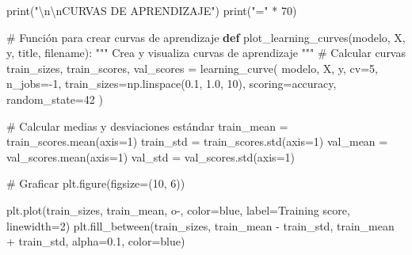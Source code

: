 \documentclass[
  doc,
  floatsintext,
  longtable,
  a4paper,
  nolmodern,
  notxfonts,
  notimes,
  12pt,
  colorlinks=true,linkcolor=blue,citecolor=blue,urlcolor=blue]{apa7}
\newenvironment{Shaded}{\begin{snugshade}}{\end{snugshade}}
\newcommand{\BuiltInTok}[1]{\textcolor[rgb]{0.00,0.23,0.31}{#1}}
\newcommand{\CharTok}[1]{\textcolor[rgb]{0.13,0.47,0.30}{#1}}
\newcommand{\CommentTok}[1]{\textcolor[rgb]{0.37,0.37,0.37}{#1}}
\newcommand{\DecValTok}[1]{\textcolor[rgb]{0.68,0.00,0.00}{#1}}
\newcommand{\FloatTok}[1]{\textcolor[rgb]{0.68,0.00,0.00}{#1}}
\newcommand{\KeywordTok}[1]{\textcolor[rgb]{0.00,0.23,0.31}{\textbf{#1}}}
\newcommand{\NormalTok}[1]{\textcolor[rgb]{0.00,0.23,0.31}{#1}}
\newcommand{\OperatorTok}[1]{\textcolor[rgb]{0.37,0.37,0.37}{#1}}
\newcommand{\StringTok}[1]{\textcolor[rgb]{0.13,0.47,0.30}{#1}}
\begin{document}
\begin{Shaded}
\begin{Highlighting}[]
\BuiltInTok{print}\NormalTok{(}\StringTok{"}\CharTok{\textbackslash{}n\textbackslash{}n}\StringTok{CURVAS DE APRENDIZAJE"}\NormalTok{)}
\BuiltInTok{print}\NormalTok{(}\StringTok{"="} \OperatorTok{*} \DecValTok{70}\NormalTok{)}

\CommentTok{\# Función para crear curvas de aprendizaje}
\KeywordTok{def}\NormalTok{ plot\_learning\_curves(modelo, X, y, title, filename):}
    \CommentTok{"""}
\CommentTok{    Crea y visualiza curvas de aprendizaje}
\CommentTok{    """}
    \CommentTok{\# Calcular curvas}
\NormalTok{    train\_sizes, train\_scores, val\_scores }\OperatorTok{=}\NormalTok{ learning\_curve(}
\NormalTok{        modelo, X, y,}
\NormalTok{        cv}\OperatorTok{=}\DecValTok{5}\NormalTok{,}
\NormalTok{        n\_jobs}\OperatorTok{={-}}\DecValTok{1}\NormalTok{,}
\NormalTok{        train\_sizes}\OperatorTok{=}\NormalTok{np.linspace(}\FloatTok{0.1}\NormalTok{, }\FloatTok{1.0}\NormalTok{, }\DecValTok{10}\NormalTok{),}
\NormalTok{        scoring}\OperatorTok{=}\StringTok{\textquotesingle{}accuracy\textquotesingle{}}\NormalTok{,}
\NormalTok{        random\_state}\OperatorTok{=}\DecValTok{42}
\NormalTok{    )}
    
    \CommentTok{\# Calcular medias y desviaciones estándar}
\NormalTok{    train\_mean }\OperatorTok{=}\NormalTok{ train\_scores.mean(axis}\OperatorTok{=}\DecValTok{1}\NormalTok{)}
\NormalTok{    train\_std }\OperatorTok{=}\NormalTok{ train\_scores.std(axis}\OperatorTok{=}\DecValTok{1}\NormalTok{)}
\NormalTok{    val\_mean }\OperatorTok{=}\NormalTok{ val\_scores.mean(axis}\OperatorTok{=}\DecValTok{1}\NormalTok{)}
\NormalTok{    val\_std }\OperatorTok{=}\NormalTok{ val\_scores.std(axis}\OperatorTok{=}\DecValTok{1}\NormalTok{)}
    
    \CommentTok{\# Graficar}
\NormalTok{    plt.figure(figsize}\OperatorTok{=}\NormalTok{(}\DecValTok{10}\NormalTok{, }\DecValTok{6}\NormalTok{))}
    
\NormalTok{    plt.plot(train\_sizes, train\_mean, }\StringTok{\textquotesingle{}o{-}\textquotesingle{}}\NormalTok{, color}\OperatorTok{=}\StringTok{\textquotesingle{}blue\textquotesingle{}}\NormalTok{, }
\NormalTok{             label}\OperatorTok{=}\StringTok{\textquotesingle{}Training score\textquotesingle{}}\NormalTok{, linewidth}\OperatorTok{=}\DecValTok{2}\NormalTok{)}
\NormalTok{    plt.fill\_between(train\_sizes, train\_mean }\OperatorTok{{-}}\NormalTok{ train\_std,}
\NormalTok{                     train\_mean }\OperatorTok{+}\NormalTok{ train\_std, alpha}\OperatorTok{=}\FloatTok{0.1}\NormalTok{, color}\OperatorTok{=}\StringTok{\textquotesingle{}blue\textquotesingle{}}\NormalTok{)}
    

\end{Highlighting}
\end{Shaded}
\end{document}
